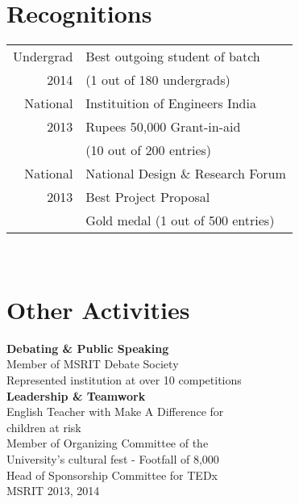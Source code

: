 \documentclass[10pt]{article} %
\begin{document}
{\begin{minipage}[t]{0.4\textwidth}

\section{\textbf{Recognitions}} 
\begin{tabular}{rl}
Undergrad & Best outgoing student of batch\\
2014 &  (1 out of 180 undergrads) \\
National & Instituition of Engineers India \\
2013  &  Rupees 50,000 Grant-in-aid  \\
         & (10 out of 200 entries) \\
National & National Design \& Research Forum  \\
2013     &  Best Project Proposal \\
         & Gold medal (1 out of 500 entries)  \\
\end{tabular}\\[10pt]


\section{\textbf{Other Activities}}
\textbf{Debating \& Public Speaking}\\
\textbullet{} Member of MSRIT Debate Society \\ \textbullet{} Represented institution at over 10 competitions \\
\textbf{Leadership \& Teamwork}\\
\textbullet{} English Teacher with Make A Difference for \\ children at risk \\ \textbullet{} Member of Organizing Committee of the \\University's cultural fest - Footfall of 8,000 \\ \textbullet{} Head of Sponsorship Committee for TEDx \\ MSRIT 2013, 2014

	

\end{minipage}}
\end{document}
